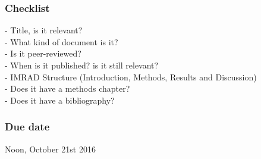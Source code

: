 \documentclass[10pt,a4paper]{article}
\begin{document}
\subsubsection*{Checklist}
- Title, is it relevant? \\
- What kind of document is it? \\
- Is it peer-reviewed? \\
- When is it published? is it still relevant?\\
- IMRAD Structure (Introduction, Methods, Results and Discussion)\\
- Does it have a methods chapter?\\
- Does it have a bibliography? \\
\subsubsection*{Due date}
Noon, October 21st 2016
\end{document}
